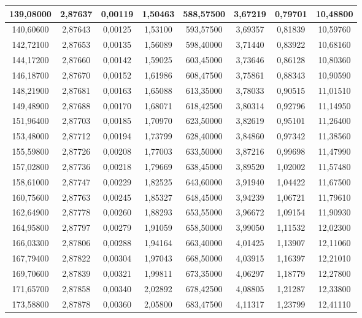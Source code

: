 \documentclass[a4paper,12pt]{article}
\numberwithin{equation}{section}
\begin{document}
\begin{appendices}
\begin{longtable}[c]{|c|c|c|c|c|c|c|c|}
139,08000	&	2,87637	&	0,00119	&	1,50463	&	588,57500	&	3,67219	&	0,79701	&	10,48800	\\\hline
140,60600	&	2,87643	&	0,00125	&	1,53100	&	593,57500	&	3,69357	&	0,81839	&	10,59760	\\\hline
142,72100	&	2,87653	&	0,00135	&	1,56089	&	598,40000	&	3,71440	&	0,83922	&	10,68160	\\\hline
144,17200	&	2,87660	&	0,00142	&	1,59025	&	603,45000	&	3,73646	&	0,86128	&	10,80360	\\\hline
146,18700	&	2,87670	&	0,00152	&	1,61986	&	608,47500	&	3,75861	&	0,88343	&	10,90590	\\\hline
148,21900	&	2,87681	&	0,00163	&	1,65088	&	613,35000	&	3,78033	&	0,90515	&	11,01510	\\\hline
149,48900	&	2,87688	&	0,00170	&	1,68071	&	618,42500	&	3,80314	&	0,92796	&	11,14950	\\\hline
151,96400	&	2,87703	&	0,00185	&	1,70970	&	623,50000	&	3,82619	&	0,95101	&	11,26400	\\\hline
153,48000	&	2,87712	&	0,00194	&	1,73799	&	628,40000	&	3,84860	&	0,97342	&	11,38560	\\\hline
155,59800	&	2,87726	&	0,00208	&	1,77003	&	633,50000	&	3,87216	&	0,99698	&	11,47990	\\\hline
157,02800	&	2,87736	&	0,00218	&	1,79669	&	638,45000	&	3,89520	&	1,02002	&	11,57480	\\\hline
158,61000	&	2,87747	&	0,00229	&	1,82525	&	643,60000	&	3,91940	&	1,04422	&	11,67500	\\\hline
160,75600	&	2,87763	&	0,00245	&	1,85327	&	648,45000	&	3,94239	&	1,06721	&	11,79610	\\\hline
162,64900	&	2,87778	&	0,00260	&	1,88293	&	653,55000	&	3,96672	&	1,09154	&	11,90930	\\\hline
164,95800	&	2,87797	&	0,00279	&	1,91059	&	658,50000	&	3,99050	&	1,11532	&	12,02300	\\\hline
166,03300	&	2,87806	&	0,00288	&	1,94164	&	663,40000	&	4,01425	&	1,13907	&	12,11060	\\\hline
167,79400	&	2,87822	&	0,00304	&	1,97043	&	668,50000	&	4,03915	&	1,16397	&	12,21010	\\\hline
169,70600	&	2,87839	&	0,00321	&	1,99811	&	673,35000	&	4,06297	&	1,18779	&	12,27800	\\\hline
171,65700	&	2,87858	&	0,00340	&	2,02892	&	678,42500	&	4,08805	&	1,21287	&	12,33800	\\\hline
173,58800	&	2,87878	&	0,00360	&	2,05800	&	683,47500	&	4,11317	&	1,23799	&	12,41110	\\\hline

\end{longtable}
\end{appendices}
\end{document}
